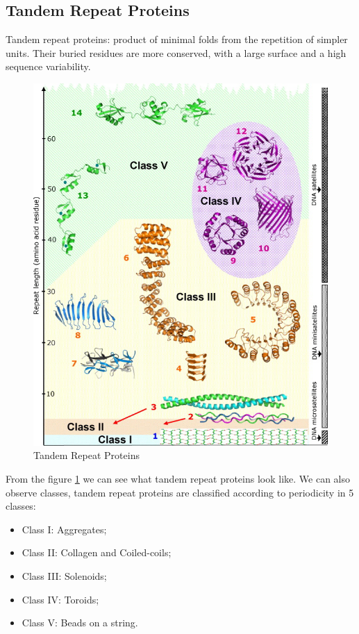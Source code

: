 \vspace{10em}

\subsection{Tandem Repeat Proteins}
Tandem repeat proteins: product of minimal folds from the repetition of simpler units. Their buried residues are more conserved, with a large surface and a high sequence variability.

\begin{figure}[h!]
	\includegraphics[scale=0.6]{res/proteins_overview/tandem.jpg}
	\centering
	\caption{Tandem Repeat Proteins}
	\label{fig:tandem}
\end{figure}

From the figure \ref{fig:tandem} we can see what tandem repeat proteins look like. We can also observe classes, tandem repeat proteins are classified according to periodicity in 5 classes:
\begin{itemize}
	\item Class I: Aggregates;
	\item Class II: Collagen and Coiled-coils;
	\item Class III: Solenoids;
	\item Class IV: Toroids;
	\item Class V: Beads on a string.
\end{itemize}

